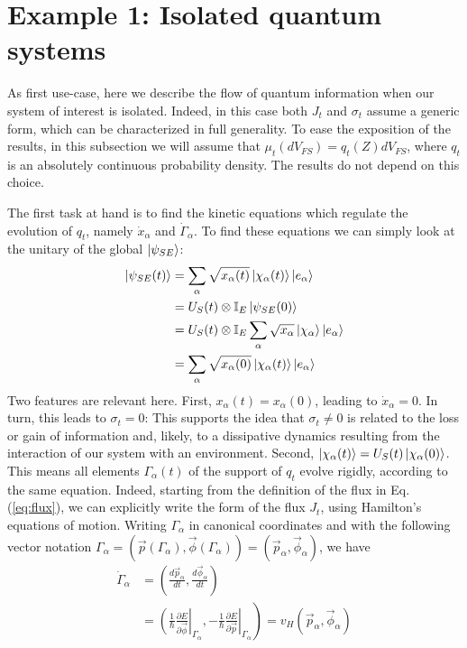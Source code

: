 \documentclass[%
 reprint,
 superscriptaddress,
 aps,
 pra,
]{revtex4-2}
\theoremstyle{definition}
\begin{document}
\section*{Example 1: Isolated quantum systems}\label{subsec:IQS}

As first use-case, here we describe the flow of quantum information when our system of interest is
isolated. Indeed, in this case both $J_t$ and $\sigma_t$ assume a generic form, which can be characterized
in full generality. To ease the exposition of the results, in this subsection we will assume that $\mu_t(dV_{FS})=q_t(Z)dV_{FS}$, 
where $q_t$ is an absolutely continuous probability density. The results do not depend on this choice. 

The first task at hand is to find the kinetic equations which regulate the evolution of $q_t$, namely $\dot{x}_\alpha$ and $\dot{\Gamma}_\alpha$.
To find these equations we can simply look at the unitary of the global $\ket{\psi_{SE}}$: 
\begin{align}
\ket{\psi_{SE}(t)} &= \sum_\alpha \sqrt{x_\alpha(t)}\ket{\chi_\alpha(t)}\ket{e_\alpha} \nonumber \\
&= U_S(t) \otimes \mathbb{I}_E  \ket{\psi_{SE}(0)} \nonumber \\
&= U_S(t) \otimes \mathbb{I}_E  \sum_\alpha \sqrt{x_\alpha} \ket{\chi_\alpha}\ket{e_\alpha} \nonumber \\
& = \sum_\alpha \sqrt{x_\alpha(0)} \ket{\chi_\alpha(t)}\ket{e_\alpha}
\end{align}
Two features are relevant here. First, $x_\alpha(t)=x_\alpha(0)$, leading to $\dot{x}_\alpha=0$. In turn, this leads to $\sigma_t=0$:
This supports the idea that $\sigma_t \neq 0$ is related to the loss or gain of information and, likely, to a dissipative dynamics
resulting from the interaction of our system with an environment. Second, $\ket{\chi_\alpha(t)}=U_S(t)\ket{\chi_\alpha(0)}$. This
means all elements $\Gamma_\alpha(t)$ of the support of $q_t$ evolve rigidly, according to the same equation. Indeed, starting from the 
definition of the flux in Eq.(\ref{eq:flux}), we can explicitly write the form of the flux $J_t$, 
using Hamilton's equations of motion. Writing $\Gamma_\alpha$ in canonical coordinates and with the following vector notation $\Gamma_\alpha = (\vec{p}(\Gamma_\alpha),\vec{\phi}(\Gamma_\alpha)) = (\vec{p}_\alpha,\vec{\phi}_\alpha)$, 
we have 
\begin{align}
\dot{\Gamma}_\alpha & = \left( \frac{d\vec{p}_\alpha}{dt}, \frac{d\vec{\phi}_\alpha}{dt}\right) \nonumber \\
& = \left.\left( \frac{1}{\hbar}\frac{\partial E}{\partial \vec{\phi}}\right\vert_{\Gamma_\alpha}, \left.-\frac{1}{\hbar}\frac{\partial E}{\partial \vec{p}}\right\vert_{\Gamma_\alpha}  \right) = v_H(\vec{p}_\alpha,\vec{\phi}_\alpha)
\end{align}
\end{document}
